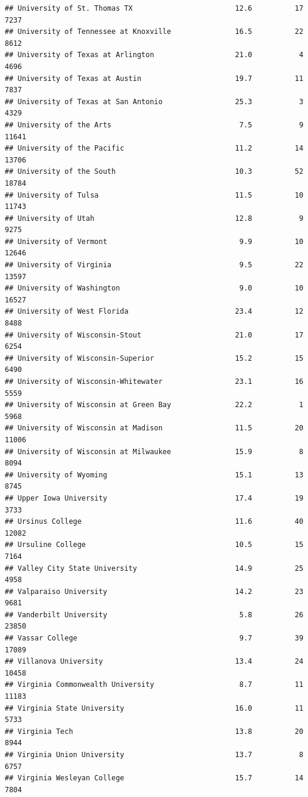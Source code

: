 \documentclass[
]{article}
\begin{document}
\begin{verbatim}
## University of St. Thomas TX                        12.6          17   7237
## University of Tennessee at Knoxville               16.5          22   8612
## University of Texas at Arlington                   21.0           4   4696
## University of Texas at Austin                      19.7          11   7837
## University of Texas at San Antonio                 25.3           3   4329
## University of the Arts                              7.5           9  11641
## University of the Pacific                          11.2          14  13706
## University of the South                            10.3          52  18784
## University of Tulsa                                11.5          10  11743
## University of Utah                                 12.8           9   9275
## University of Vermont                               9.9          10  12646
## University of Virginia                              9.5          22  13597
## University of Washington                            9.0          10  16527
## University of West Florida                         23.4          12   8488
## University of Wisconsin-Stout                      21.0          17   6254
## University of Wisconsin-Superior                   15.2          15   6490
## University of Wisconsin-Whitewater                 23.1          16   5559
## University of Wisconsin at Green Bay               22.2           1   5968
## University of Wisconsin at Madison                 11.5          20  11006
## University of Wisconsin at Milwaukee               15.9           8   8094
## University of Wyoming                              15.1          13   8745
## Upper Iowa University                              17.4          19   3733
## Ursinus College                                    11.6          40  12082
## Ursuline College                                   10.5          15   7164
## Valley City State University                       14.9          25   4958
## Valparaiso University                              14.2          23   9681
## Vanderbilt University                               5.8          26  23850
## Vassar College                                      9.7          39  17089
## Villanova University                               13.4          24  10458
## Virginia Commonwealth University                    8.7          11  11183
## Virginia State University                          16.0          11   5733
## Virginia Tech                                      13.8          20   8944
## Virginia Union University                          13.7           8   6757
## Virginia Wesleyan College                          15.7          14   7804

\end{verbatim}
\end{document}
